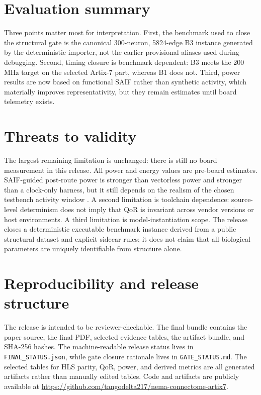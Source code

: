 \documentclass[11pt]{article}
\begin{document}
\begin{table}[t]
\centering
\small
\resizebox{\linewidth}{!}{}
\caption{Derived metrics for canonical B3 using the final SAIF-guided power selection.}
\label{tab:metrics}
\end{table}

\section{Evaluation summary}
Three points matter most for interpretation.
First, the benchmark used to close the structural gate is the canonical 300-neuron, 5824-edge B3 instance generated by the deterministic importer, not the earlier provisional aliases used during debugging. Second, timing closure is benchmark dependent: B3 meets the 200 MHz target on the selected Artix-7 part, whereas B1 does not. Third, power results are now based on functional SAIF rather than synthetic activity, which materially improves representativity, but they remain estimates until board telemetry exists.

\section{Threats to validity}
The largest remaining limitation is unchanged: there is still no board measurement in this release. All power and energy values are pre-board estimates. SAIF-guided post-route power is stronger than vectorless power and stronger than a clock-only harness, but it still depends on the realism of the chosen testbench activity window \cite{amd_ug907,amd_ug900}. A second limitation is toolchain dependence: source-level determinism does not imply that QoR is invariant across vendor versions or host environments. A third limitation is model-instantiation scope. The release closes a deterministic executable benchmark instance derived from a public structural dataset and explicit sidecar rules; it does not claim that all biological parameters are uniquely identifiable from structure alone.

\section{Reproducibility and release structure}
The release is intended to be reviewer-checkable. The final bundle contains the paper source, the final PDF, selected evidence tables, the artifact bundle, and SHA-256 hashes. The machine-readable release status lives in \texttt{FINAL\_STATUS.json}, while gate closure rationale lives in \texttt{GATE\_STATUS.md}. The selected tables for HLS parity, QoR, power, and derived metrics are all generated artifacts rather than manually edited tables. Code and artifacts are publicly available at \url{https://github.com/tangodelta217/nema-connectome-artix7}.
\end{document}
